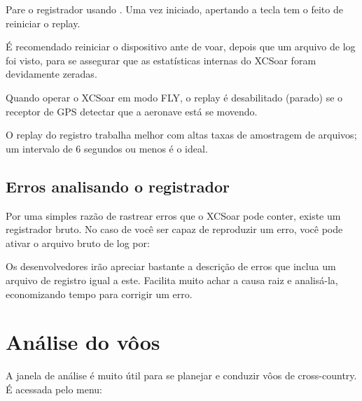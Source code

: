 Pare o registrador usando   .
Uma vez iniciado, apertando a tecla   tem o feito de reiniciar o replay.

\tip É recomendado reiniciar o dispositivo ante de voar, depois que um arquivo de log foi visto, para se assegurar que as estatísticas internas do XCSoar foram devidamente zeradas.

Quando operar o XCSoar em modo FLY, o replay é desabilitado (parado) se o receptor de GPS detectar que a aeronave está se movendo.

O replay do registro trabalha melhor com altas taxas de amostragem de arquivos; um intervalo de 6 segundos ou menos é o ideal.


\subsection*{Erros analisando o registrador}\label{sec:raw-logger} Por uma simples razão de rastrear erros que o XCSoar pode conter, existe um registrador bruto.  No caso de você ser capaz de reproduzir um erro, você pode ativar o arquivo bruto de log por:
\begin{quote}
\blink{}
\end{quote}
Os desenvolvedores irão apreciar bastante a descrição de erros que inclua um arquivo de registro igual a este.  Facilita muito achar a causa raiz e analisá-la, economizando tempo para corrigir um erro.  

\section{Análise do vôos} \label{sec:analysis-climb}

A janela de análise é muito útil para se planejar e conduzir vôos de cross-country.  É acessada pelo menu: 
\begin{quote}
\blink{}
\end{quote}


